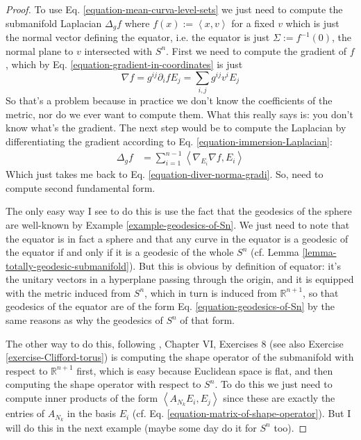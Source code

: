 \documentclass{book}
\begin{document}
\begin{proof}
To use Eq.
\ref{equation-mean-curva-level-sets} we just
need to compute
the submanifold Laplacian $\Delta_gf$ where
$f(x):=\left\langle{}x,v\right\rangle{}$ for a fixed
$v$ which is just the normal vector defining
the equator, i.e. the equator is
just  $\Sigma:=f^{-1}(0)$, the normal plane
to $v$ intersected with $S^n$. First
we need to compute the gradient of $f$, which
by Eq.
\ref{equation-gradient-in-coordinates} is
just
$$
\nabla
f=g^{ij}\partial_ifE_j=\sum_{i,j}g^{ij}v^iE_j
$$
So that's a problem because in practice we
don't know the coefficients of the
metric, nor do we ever want to compute them.
What this really says is: you don't
know what's the gradient. The next step would
be to compute the Laplacian by
differentiating the gradient
according to Eq.
\ref{equation-immersion-Laplacian}:
$$
\begin{aligned}
\Delta_gf&=\sum_{i=1}^{n-1}\left\langle{}\nabla_{E_i}
\nabla
f,E_i\right\rangle{}
\end{aligned}
$$
Which just takes me back to Eq.
\ref{equation-diver-norma-gradi}. So, need
to compute second fundamental form.

The only easy way I see to do this is use the
fact that the geodesics of the
sphere are well-known by Example
\ref{example-geodesics-of-Sn}. We just need
to
note that the equator is in fact a sphere and
that any curve in the equator is a
geodesic of the equator if and only if it is
a geodesic of the whole $S^n$ (cf.
Lemma
\ref{lemma-totally-geodesic-submanifold}).
But this is obvious by
definition of equator: it's the unitary
vectors in a hyperplane passing through
the origin, and it is equipped with the
metric induced from $S^n$, which in turn
is induced from $\mathbb{R}^{n+1}$, so that
geodesics of the equator are of the
form Eq. \ref{equation-geodesics-of-Sn} by
the same reasons as why the geodesics
of $S^n$ of that form.

The other way to do this, following
\cite{doc}, Chapter VI, Exercises 8 (see also
Exercise \ref{exercise-Clifford-torus}) is
computing the shape operator of the
submanifold with respect to
$\mathbb{R}^{n+1}$ first, which is easy
because
Euclidean space is flat, and then computing
the shape operator with respect to
$S^n$. To do this we just need to compute
inner products of the form
$\left\langle{}A_{N_k}E_i,E_j\right\rangle{}$ since these are
exactly the entries of $A_{N_k}$
in the basis $E_i$ (cf. Eq.
\ref{equation-matrix-of-shape-operator}). But
I will
do this in the next example (maybe some day
do it for $S^n$ too).
\end{proof}
\end{document}

